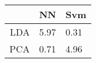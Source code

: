 \begin{tabular}{|r|l|l|}
  \hline
    & NN & Svm \\
  \hline
  LDA & 5.97 & 0.31 \\
  \hline
  PCA & 0.71 & 4.96 \\
  \hline
\end{tabular}
